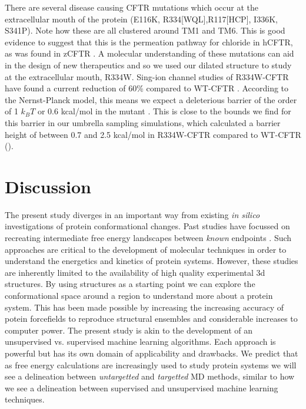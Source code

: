 There are several disease causing CFTR mutations which occur at the extracellular mouth of the protein (E116K, R334[WQL],R117[HCP], I336K, S341P)\cite{cftr2}. Note how these are all clustered around TM1 and TM6. This is good evidence to suggest that this is the permeation pathway for chloride in hCFTR, as was found in zCFTR \cite{farkas2020}. A molecular understanding of these mutations can aid in the design of new therapeutics and so we used our dilated structure to study at the extracellular mouth, R334W. Sing-ion channel studies of R334W-CFTR have found a current reduction of 60\% compared to WT-CFTR \cite{gong2004}. According to the Nernst-Planck model, this means we expect a deleterious barrier of the order of 1 $k_B T$ or 0.6 kcal/mol in the mutant \cite{}. This is close to the bounds we find for this barrier in our umbrella sampling simulations, which calculated a barrier height of between 0.7 and 2.5 kcal/mol in R334W-CFTR compared to WT-CFTR (). 


\section{Discussion}

The present study diverges in an important way from existing \textit{in silico} investigations of protein conformational changes. Past studies have focussed on recreating intermediate free energy landscapes between \textit{known} endpoints \cite{lev2020, bergh2021, moradi2015}. Such approaches are critical to the development of molecular techniques in order to understand the energetics and kinetics of protein systems. However, these studies are inherently limited to the availability of high quality experimental 3d structures. By using structures as a starting point we can explore the conformational space around a region to understand more about a protein system. This has been made possible by increasing the increasing accuracy of potein forcefields to reproduce structural ensembles \cite{huang2016} and considerable increases to computer power. The present study is akin to the development of an unsupervised vs. supervised machine learning algorithms. Each approach is powerful but has its own domain of applicability and drawbacks. 
We predict that as free energy calculations are increasingly used to study protein systems we will see a delineation between \textit{untargetted} and \textit{targetted} MD methods, similar to how we see a delineation between supervised and unsupervised machine learning techniques.

